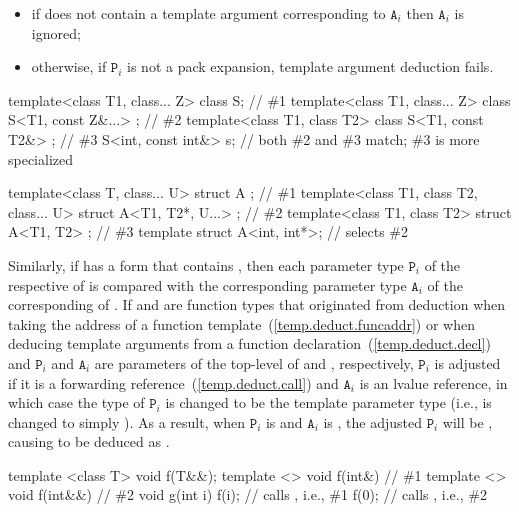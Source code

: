 \begin{itemize}
\item if  does not contain a template argument corresponding to
$\texttt{A}_i$ then $\texttt{A}_i$ is ignored;

\item otherwise, if $\texttt{P}_i$ is not a pack expansion, template argument
deduction fails.
\end{itemize}
\enterexample
\begin{codeblock}
template<class T1, class... Z> class S;                               // \#1
template<class T1, class... Z> class S<T1, const Z&...> { };          // \#2
template<class T1, class T2>   class S<T1, const T2&> { };            // \#3
S<int, const int&> s;         // both \#2 and \#3 match; \#3 is more specialized

template<class T, class... U>            struct A { };                // \#1
template<class T1, class T2, class... U> struct A<T1, T2*, U...> { }; // \#2
template<class T1, class T2>             struct A<T1, T2> { };        // \#3
template struct A<int, int*>; // selects \#2
\end{codeblock}
\exitexample

\pnum
Similarly, if  has a form that contains
, then each parameter type $\texttt{P}_i$
of the respective  of
 is compared with the corresponding parameter type
$\texttt{A}_i$ of the corresponding 
of .
If  and  are function types that originated from deduction when
taking the address of a function template~(\ref{temp.deduct.funcaddr}) or when
deducing template arguments from a function declaration~(\ref{temp.deduct.decl})
and $\texttt{P}_i$ and $\texttt{A}_i$ are parameters of the top-level
 of  and , respectively,
$\texttt{P}_i$ is adjusted if it is a forwarding reference~(\ref{temp.deduct.call})
and $\texttt{A}_i$ is an lvalue reference, in which case the type of
$\texttt{P}_i$ is changed to be the template parameter type (i.e.,  is
changed to simply ). \enternote As a result, when $\texttt{P}_i$ is 
and $\texttt{A}_i$ is , the adjusted $\texttt{P}_i$ will be ,
causing  to be deduced as . \exitnote
\enterexample
\begin{codeblock}
template <class T> void f(T&&);
template <> void f(int&) { }  // \#1
template <> void f(int&&) { } // \#2
void g(int i) {
  f(i);                       // calls , i.e., \#1
  f(0);                       // calls , i.e., \#2
}
\end{codeblock}
\exitexample

